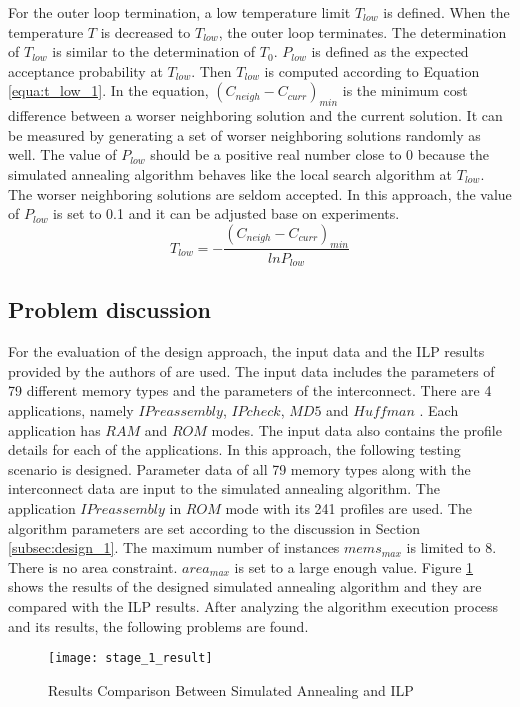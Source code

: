 		For the outer loop termination, a low temperature limit $T_{low}$ is defined.
		When the temperature $T$ is decreased to $T_{low}$, the outer loop terminates.
		The determination of $T_{low}$ is similar to the determination of $T_{0}$.
		$P_{low}$ is defined as the expected acceptance probability at $T_{low}$.
		Then $T_{low}$ is computed according to Equation \ref{equa:t_low_1}.
		In the equation, $\left( C_{neigh}-C_{curr} \right)_{min}$ is the minimum cost
		difference between a worser neighboring solution and the current solution.
		It can be measured by generating a set of worser neighboring solutions randomly
		as well. The value of $P_{low}$ should be a positive real number close to 0
		because the simulated annealing algorithm behaves like the local search algorithm
		at $T_{low}$. The worser neighboring solutions are seldom accepted.
		In this approach, the value of $P_{low}$ is set to 0.1 and it can be adjusted
		base on experiments.
		\begin{equation}
		\label{equa:t_low_1}
			T_{low}= - \frac{\left( C_{neigh}-C_{curr} \right)_{min}}{ln{P_{low}}}
		\end{equation}	
	
		\subsection{Problem discussion}
		\label{subsec:problem_1}
		For the evaluation of the design approach, the input data and the ILP results
		provided by the authors of \cite{Strobel2016} are used.
		The input data includes the parameters of 79 different memory types
		and the parameters of the interconnect.
		There are 4 applications, namely $IP reassembly$, $IP check$, $MD5$ and
		$Huffman$ \cite{Strobel2016}. Each application has $RAM$ and $ROM$ modes.
		The input data also contains the profile details for each of the applications.
		In this approach, the following testing scenario is designed.
		Parameter data of all 79 memory types along with the interconnect
		data are input to the simulated annealing algorithm.
		The application $IP reassembly$ in $ROM$ mode with its 241 profiles are used.
		The algorithm parameters are set according to the discussion in Section
		\ref{subsec:design_1}.
		The maximum number of instances $mems_{max}$ is limited to 8.
		There is no area constraint. $area_{max}$ is set to a large enough value.
		Figure \ref{fig:stage_1_result} shows the results of the designed simulated
		annealing algorithm and they are compared with the ILP results.
		After analyzing the algorithm execution process and its results,
		the following problems are found.
		\begin{figure}[h]
			\begin{center}
				\texttt{[image: stage\_1\_result]}
				\caption{Results Comparison Between Simulated Annealing and ILP}
				\label{fig:stage_1_result}
			\end{center}
		\end{figure}	
	
